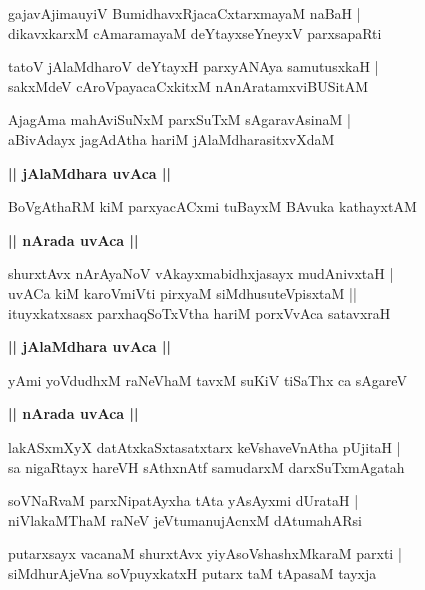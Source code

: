 \documentclass[twoside,12pt,openright]{book}
\newcounter{shloka}[chapter]
\def\uvaca#1{\centerline{{\large\textbf{#1}}}}
\begin{document}
\begin{shloka}%
gajavAjimauyiV BumidhavxRjacaCxtarxmayaM naBaH |\\
dikavxkarxM cAmaramayaM deYtayxseYneyxV parxsapaRti 
\end{shloka}

\begin{shloka}%
tatoV jAlaMdharoV deYtayxH parxyANAya samutusxkaH |\\
sakxMdeV cAroVpayacaCxkitxM nAnAratamxviBUSitAM 
\end{shloka}

\begin{shloka}%
AjagAma mahAviSuNxM parxSuTxM sAgaravAsinaM |\\
aBivAdayx jagAdAtha hariM jAlaMdharasitxvXdaM 
\end{shloka}

\uvaca{|| jAlaMdhara uvAca ||}

\begin{shloka}%
BoVgAthaRM kiM parxyacACxmi tuBayxM BAvuka kathayxtAM 
\end{shloka}

\uvaca{|| nArada uvAca ||}

\begin{shloka}%
shurxtAvx nArAyaNoV vAkayxmabidhxjasayx mudAnivxtaH |\\
uvACa kiM karoVmiVti pirxyaM siMdhusuteVpisxtaM ||\\
ituyxkatxsasx parxhaqSoTxVtha hariM porxVvAca satavxraH 
\end{shloka}

\uvaca{|| jAlaMdhara uvAca ||}

\begin{shloka}%
yAmi yoVdudhxM raNeVhaM tavxM suKiV tiSaThx ca sAgareV 
\end{shloka}

\uvaca{|| nArada uvAca ||}

\begin{shloka}%
lakASxmXyX datAtxkaSxtasatxtarx keVshaveVnAtha pUjitaH |\\
sa nigaRtayx hareVH sAthxnAtf samudarxM darxSuTxmAgatah
\end{shloka}

\begin{shloka}%
soVNaRvaM parxNipatAyxha tAta yAsAyxmi dUrataH |\\
niVlakaMThaM raNeV jeVtumanujAcnxM dAtumahARsi 
\end{shloka}

\begin{shloka}%
putarxsayx vacanaM shurxtAvx yiyAsoVshashxMkaraM parxti |\\
siMdhurAjeVna soVpuyxkatxH putarx taM tApasaM tayxja 
\end{shloka}
\end{document}
